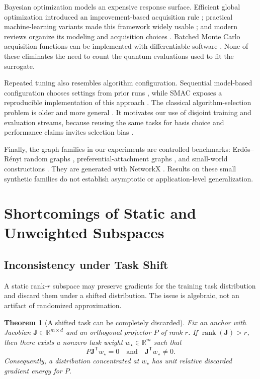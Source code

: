 \documentclass[aps,prx,reprint,superscriptaddress,floatfix]{revtex4-2}
\newtheorem{theorem}{Theorem}[section]
\newcommand{\R}{\mathbb{R}}
\newcommand{\J}{\mathbf{J}}
\newcommand{\trans}{\mathsf{T}}
\begin{document}
Bayesian optimization models an expensive response surface.  Efficient global
optimization introduced an improvement-based acquisition rule
\citep{jones1998efficient}; practical machine-learning variants made this
framework widely usable \citep{snoek2012practical}; and modern reviews organize
its modeling and acquisition choices \citep{shahriari2016taking}.  Batched
Monte Carlo acquisition functions can be implemented with differentiable
software \citep{balandat2020botorch}.  None of these eliminates the need to
count the quantum evaluations used to fit the surrogate.

Repeated tuning also resembles algorithm configuration.  Sequential
model-based configuration chooses settings from prior runs
\citep{hutter2011sequential}, while SMAC exposes a reproducible implementation
of this approach \citep{lindauer2022smac3}.  The classical algorithm-selection
problem is older and more general \citep{rice1976selection}.  It motivates our
use of disjoint training and evaluation streams, because reusing the same
tasks for basis choice and performance claims invites selection bias
\citep{cawley2010overfitting}.

Finally, the graph families in our experiments are controlled benchmarks:
Erd\H{o}s--R\'enyi random graphs \citep{erdos1959random}, preferential-attachment
graphs \citep{barabasi1999emergence}, and small-world constructions
\citep{watts1998collective}.  They are generated with NetworkX
\citep{hagberg2008networkx}.  Results on these small synthetic families do not
establish asymptotic or application-level generalization.

\section{Shortcomings of Static and Unweighted Subspaces}

\subsection{Inconsistency under Task Shift}

A static rank-$r$ subspace may preserve gradients for the training task
distribution and discard them under a shifted distribution.  The issue is
algebraic, not an artifact of randomized approximation.

\begin{theorem}[A shifted task can be completely discarded]
\label{thm:shift}
Fix an anchor with Jacobian $\J\in\R^{m\times d}$ and an orthogonal projector
$P$ of rank $r$.  If
$\operatorname{rank}(\J)>r$, then there exists a nonzero task weight
$w_\star\in\R^m$ such that
\[
 P\J^{\trans}w_\star=0
 \quad\text{and}\quad
 \J^{\trans}w_\star\ne0.
\]
Consequently, a distribution concentrated at $w_\star$ has unit relative
discarded gradient energy for $P$.
\end{theorem}
\end{document}
